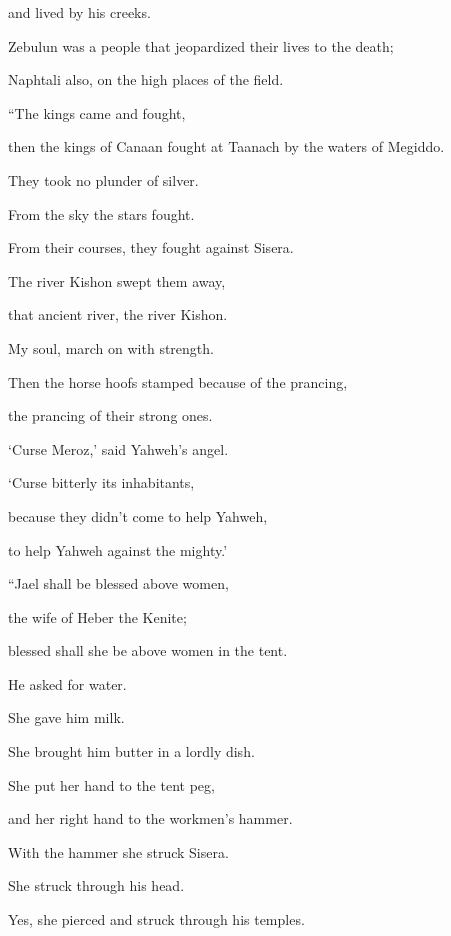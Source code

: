 {\par }{\QB and lived by his creeks.
\par }{\Q {}Zebulun was a people that jeopardized their lives to the death;
\par }{\QB Naphtali also, on the high places of the field.
\par }{\BB \par }{\Q {}“The kings came and fought,
\par }{\QB then the kings of Canaan fought at Taanach by the waters of Megiddo.
\par }{\QB They took no plunder of silver.
\par }{\Q {}From the sky the stars fought.
\par }{\QB From their courses, they fought against Sisera.
\par }{\Q {}The river Kishon swept them away,
\par }{\QB that ancient river, the river Kishon.
\par }{\QB My soul, march on with strength.
\par }{\Q {}Then the horse hoofs stamped because of the prancing,
\par }{\QB the prancing of their strong ones.
\par }{\Q {}‘Curse Meroz,’ said Yahweh’s angel.
\par }{\QB ‘Curse bitterly its inhabitants,
\par }{\QB because they didn’t come to help Yahweh,
\par }{\QB to help Yahweh against the mighty.’
\par }{\BB \par }{\Q {}“Jael shall be blessed above women,
\par }{\QB the wife of Heber the Kenite;
\par }{\QB blessed shall she be above women in the tent.
\par }{\Q {}He asked for water.
\par }{\QB She gave him milk.
\par }{\QB She brought him butter in a lordly dish.
\par }{\Q {}She put her hand to the tent peg,
\par }{\QB and her right hand to the workmen’s hammer.
\par }{\Q With the hammer she struck Sisera.
\par }{\QB She struck through his head.
\par }{\QB Yes, she pierced and struck through his temples.
}
